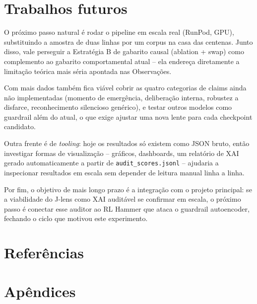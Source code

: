 \documentclass{article}
\begin{document}
\section{Trabalhos futuros}

O próximo passo natural é rodar o pipeline em escala real (RunPod, GPU),
substituindo a amostra de duas linhas por um corpus na casa das centenas.
Junto disso, vale perseguir a Estratégia B de gabarito causal (ablation +
swap) como complemento ao gabarito comportamental atual -- ela endereça
diretamente a limitação teórica mais séria apontada nas Observações.

Com mais dados também fica viável cobrir as quatro categorias de claims
ainda não implementadas (momento de emergência, deliberação interna,
robustez a disfarce, reconhecimento silencioso genérico), e testar outros
modelos como guardrail além do atual, o que exige ajustar uma nova lente
para cada checkpoint candidato.

Outra frente é de \emph{tooling}: hoje os resultados só existem como JSON
bruto, então investigar formas de visualização -- gráficos, dashboards, um
relatório de XAI gerado automaticamente a partir de
\texttt{audit\_scores.jsonl} -- ajudaria a inspecionar resultados em escala
sem depender de leitura manual linha a linha.

Por fim, o objetivo de mais longo prazo é a integração com o projeto
principal: se a viabilidade do J-lens como XAI auditável se confirmar em
escala, o próximo passo é conectar esse auditor ao RL Hammer que ataca o
guardrail autoencoder, fechando o ciclo que motivou este experimento.

\section{Referências}
\printbibliography[heading=none]

\appendix
\section{Apêndices}
\end{document}
